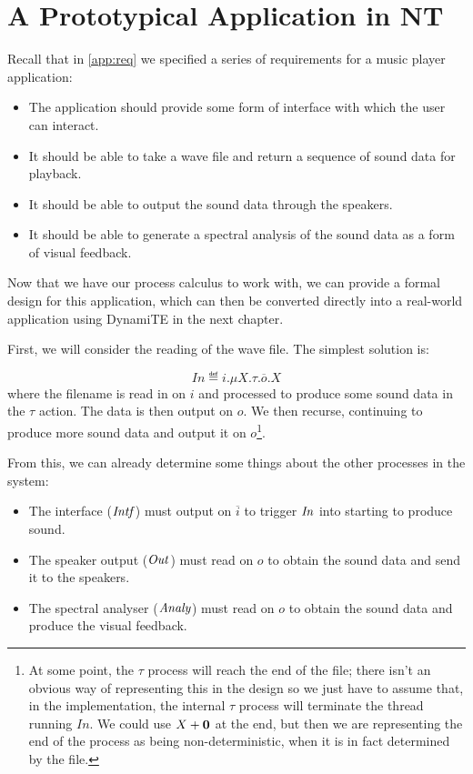 \section{A Prototypical Application in NT}
\label{app:nt}

Recall that in \ref{app:req} we specified a series of requirements for a music player application:

\begin{itemize}
\item The application should provide some form of interface with which
  the user can interact.
\item It should be able to take a wave file and return a sequence of
  sound data for playback.
\item It should be able to output the sound data through the speakers.
\item It should be able to generate a spectral analysis of the sound
  data as a form of visual feedback.
\end{itemize}

Now that we have our process calculus to work with, we can provide a formal design for this application,
which can then be converted directly into a real-world application using DynamiTE in the next chapter.

First, we will consider the reading of the wave file.  The simplest solution is:

\begin{equation}
  In \eqdef i.\mu X.\tau.\overline{o}.X
\end{equation}
\noindent where the filename is read in on $i$ and processed to
produce some sound data in the $\tau$ action.  The data is then output
on $o$.  We then recurse, continuing to produce more sound data and
output it on $o$\footnote{At some point, the $\tau$ process will reach
  the end of the file; there isn't an obvious way of representing this
  in the design so we just have to assume that, in the implementation,
  the internal $\tau$ process will terminate the thread running
  $In$.  We could use $X + \textbf{0}$ at the end, but then we are
  representing the end of the process as being non-deterministic, when
  it is in fact determined by the file.}.

From this, we can already determine some things about the other processes in the system:

\begin{itemize}
\item The interface ($\mathit{Intf}$) must output on $\overline{i}$ to
  trigger $\mathit{In}$ into starting to produce sound.
\item The speaker output ($\mathit{Out}$) must read on $o$ to obtain the sound
  data and send it to the speakers.
\item The spectral analyser ($\mathit{Analy}$) must read on $o$ to obtain the
  sound data and produce the visual feedback.
\end{itemize}

